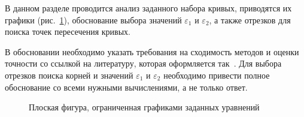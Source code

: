 \documentclass[a4paper,12pt,titlepage,finall]{article}
\begin{document}
В данном разделе проводится анализ заданного набора кривых, приводятся их графики (рис.~\ref{plot1}),
обоснование выбора значений $\varepsilon_1$ и $\varepsilon_2$, а также отрезков для поиска точек
пересечения кривых.

В обосновании необходимо указать требования на сходимость методов и оценки точности со ссылкой на
литературу, которая оформляется так~\cite{math}. Для выбора отрезков поиска корней и значений $\varepsilon_1$ и $\varepsilon_2$ необходимо
привести полное обоснование со всеми нужными вычислениями, а не только ответ.

\begin{figure}[h]
\centering
{}
\caption{Плоская фигура, ограниченная графиками заданных уравнений}
\label{plot1}
\end{figure}
\end{document}
